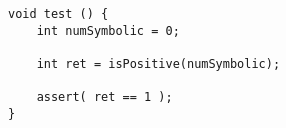 \begin{minipage}{15cm}
\begin{lstlisting}[style=CStyle, caption=Automatically generated oracle for function 'isPositive'., label=isPositiveOracle]
void test () { 
	int numSymbolic = 0;
 	
 	int ret = isPositive(numSymbolic); 
	
	assert( ret == 1 ); 
}
\end{lstlisting}
\end{minipage}